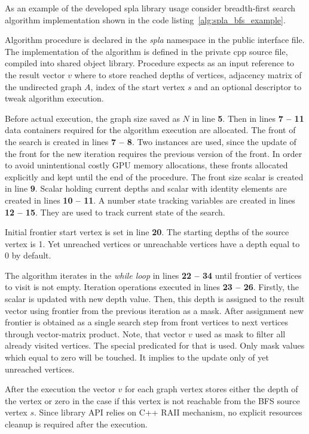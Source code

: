 As an example of the developed spla library usage consider breadth-first search algorithm implementation shown in the code listing~\ref{alg:spla_bfs_example}. 

Algorithm procedure is declared in the \textit{spla} namespace in the public interface file. The implementation of the algorithm is defined in the private cpp source file, compiled into shared object library. Procedure expects as an input reference to the result vector $v$ where to store reached depths of vertices, adjacency matrix of the undirected graph $A$, index of the start vertex $s$ and an optional descriptor to tweak algorithm execution.

Before actual execution, the graph size saved as $N$ in line \textbf{5}. Then in lines \textbf{7 -- 11} data containers required for the algorithm execution are allocated. The front of the search is created in lines \textbf{7 -- 8}. Two instances are used, since the update of the front for the new iteration requires the previous version of the front. In order to avoid unintentional costly GPU memory allocations, these fronts allocated explicitly and kept until the end of the procedure. The front size scalar is created in line \textbf{9}. Scalar holding current depths and scalar with identity elements are created in lines \textbf{10 -- 11}. A number state tracking variables are created in lines \textbf{12 -- 15}. They are used to track current state of the search.

Initial frontier start vertex is set in line \textbf{20}. The starting depths of the source vertex is 1. Yet unreached vertices or unreachable vertices have a depth equal to 0 by default.

The algorithm iterates in the \textit{while loop} in lines \textbf{22 -- 34} until frontier of vertices to visit is not empty. Iteration operations executed in lines \textbf{23 -- 26}. Firstly, the scalar is updated with new depth value. Then, this depth is assigned to the result vector using frontier from the previous iteration as a mask. After assignment new frontier is obtained as a single search step from front vertices to next vertices through vector-matrix product. Note, that vector $v$ used as mask to filter all already visited vertices. The special predicated for that is used. Only mask values which equal to zero will be touched. It implies to the update only of yet unreached vertices. 

After the execution the vector $v$ for each graph vertex stores either the depth of the vertex or zero in the case if this vertex is not reachable from the BFS source vertex $s$. Since library API relies on C++ RAII mechanism, no explicit resources cleanup is required after the execution.